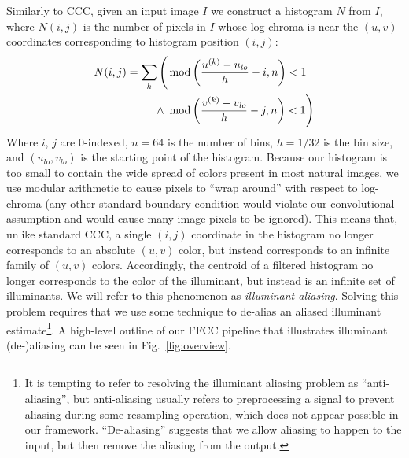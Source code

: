 \documentclass[10pt,twocolumn,letterpaper]{article}
\newcommand{\binwidth}{h}
\begin{document}
Similarly to CCC, given an input image $I$ we construct a histogram $N$ from $I$,
where $N(i,j)$ is the number of pixels in $I$ whose log-chroma is near the
$(u, v)$ coordinates corresponding to histogram position $(i, j)$:
\begin{align}
N(i, j) = \displaystyle \sum_k \Bigg( & \operatorname{mod} \left( { u^{(k)} - u_\mathit{lo} \over \binwidth} - i, n \right) < 1 \nonumber \\
\wedge \,\, & \operatorname{mod} \left( { v^{(k)} - v_\mathit{lo} \over \binwidth} - j, n \right) < 1 \Bigg) \label{eq:Nhist}
\end{align}
Where $i$, $j$ are $0$-indexed,
$n = 64$ is the number of bins,
$\binwidth = 1/32$ is the bin size, and
$(u_{\mathit{lo}}, v_{\mathit{lo}})$ is the starting point of the histogram.
Because our histogram is too small to contain the wide spread of colors present
in most natural images,
we use modular arithmetic to cause pixels to ``wrap around'' with respect to log-chroma
(any other standard boundary condition would violate our convolutional
assumption and would cause many image pixels to be ignored).
This means that, unlike standard CCC,
a single $(i,j)$ coordinate in the histogram no longer corresponds to
an absolute $(u,v)$ color, but instead corresponds to an infinite family of
$(u,v)$ colors.
Accordingly, the
centroid of a filtered histogram no longer corresponds to the color of the
illuminant, but instead is an infinite set of illuminants.
We will refer to this phenomenon as \emph{illuminant aliasing}.
Solving this problem requires that we use some technique to de-alias an aliased
illuminant estimate\footnote{It is tempting to refer to resolving the illuminant
aliasing problem as ``anti-aliasing'', but anti-aliasing usually refers to
preprocessing a signal to prevent aliasing during some resampling operation,
which does not appear possible in our framework.
``De-aliasing'' suggests that we allow aliasing to happen to the input, but then
remove the aliasing from the output.}.
A high-level outline of our FFCC pipeline that illustrates illuminant (de-)aliasing
can be seen in Fig.~\ref{fig:overview}.
\end{document}
